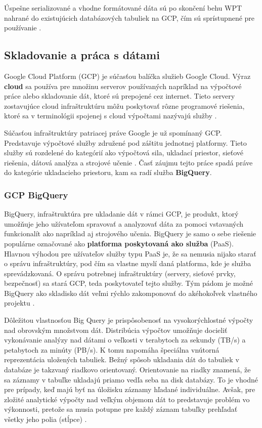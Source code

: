Úspešne serializované a vhodne formátované dáta sú po skončení behu WPT nahrané do existujúcich databázových tabuliek na GCP, čím sú sprístupnené pre používanie \cite{httparchive-faq}. 

\subsection{Skladovanie a práca s dátami}
Google Cloud Platform (GCP) je súčasťou balíčka služieb Google Cloud. 
Výraz \textbf{cloud} sa používa pre množinu serverov používaných napríklad na výpočtové práce alebo skladovanie dát, ktoré sú prepojené cez internet.
Tieto servery zostavujúce cloud infraštruktúru môžu poskytovať rôzne programové riešenia, ktoré sa v terminológii spojenej s cloud výpočtami nazývajú služby \cite{cloudflare-clouddefinition}.

Súčasťou infraštruktúry patriacej práve Google je už spomínaný GCP. Predstavuje výpočtové služby združené pod záštitu jednotnej platformy.
Tieto služby sú rozdelené do kategórií ako výpočtová sila, ukladací priestor, sieťové riešenia, dátová analýza a strojové učenie \cite{gfg-gcp}.
Časť záujmu tejto práce spadá práve do kategórie ukladacieho priestoru, kam sa radí služba \textbf{BigQuery}.

\subsubsection{GCP BigQuery}

BigQuery, infraštruktúra pre ukladanie dát v rámci GCP, je produkt, ktorý umožňuje jeho užívateľom spravovať a analyzovať dáta za pomoci vstavaných funkcionalít ako napríklad aj strojového učenia.
BigQuery je samo o sebe riešenie populárne označované ako \textbf{platforma poskytovaná ako služba} (PaaS).
Hlavnou výhodou pre užívateľov služby typu PaaS je, že sa nemusia nijako starať o správu infraštruktúry, pod čím sa vlastne myslí daná platforma, kde je služba sprevádzkovaná.
O správu potrebnej infraštruktúry (servery, sieťové prvky, bezpečnosť) sa stará GCP, teda poskytovateľ tejto služby.
Tým pádom je možné BigQuery ako skladisko dát veľmi rýchlo zakomponovať do akéhokoľvek vlastného projektu \cite{google-bq}.

Dôležitou vlastnosťou Big Query je prispôsobenosť na vysokorýchlostné výpočty nad obrovským množstvom dát.
Distribúcia výpočtov umožňuje docieliť vykonávanie analýzy nad dátami o veľkosti v terabytoch za sekundy (TB/s) a petabytoch za minúty (PB/s).
K tomu napomáha špeciálna vnútorná reprezentácia uložených tabuliek. 
Bežný spôsob ukladania dát do tabuliek v databáze je takzvaný riadkovo orientovaný.
Orientovanie na riadky znamená, že sa záznamy v tabuľke ukladajú priamo vedľa seba na disk databázy.
To je vhodné pre prípady, keď majú byť na úložisku záznamy hľadané individuálne.
Avšak, pre zložité analytické výpočty nad veľkým objemom dát to predstavuje problém vo výkonnosti, pretože sa musia potupne pre každý záznam tabuľky prehľadať všetky jeho polia (stĺpce) \cite{google-bq}.

